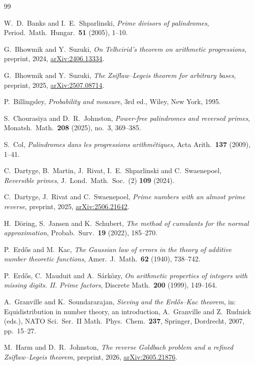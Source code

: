 \documentclass[11pt,a4paper]{article}
\theoremstyle{plain}
\theoremstyle{definition}
\numberwithin{equation}{section}
\begin{document}
\begin{thebibliography}{99}

 W.~D.~Banks and I.~E.~Shparlinski, \emph{Prime divisors of palindromes},
Period.\ Math.\ Hungar.\ \textbf{51} (2005), 1--10.

 G.~Bhowmik and Y.~Suzuki, \emph{On Telhcirid's theorem on arithmetic progressions},
preprint, 2024, \href{https://arxiv.org/abs/2406.13334}{arXiv:2406.13334}.

 G.~Bhowmik and Y.~Suzuki, \emph{The Zsiflaw--Legeis theorem for arbitrary bases},
preprint, 2025, \href{https://arxiv.org/abs/2507.08714}{arXiv:2507.08714}.

 P.~Billingsley, \emph{Probability and measure}, 3rd ed., Wiley, New York, 1995.

 S.~Chourasiya and D.~R.~Johnston, \emph{Power-free palindromes and reversed primes},
Monatsh.\ Math.\ \textbf{208} (2025), no.~3, 369--385.

 S.~Col, \emph{Palindromes dans les progressions arithm\'etiques},
Acta Arith.\ \textbf{137} (2009), 1--41.

 C.~Dartyge, B.~Martin, J.~Rivat, I.~E.~Shparlinski and C.~Swaenepoel,
\emph{Reversible primes},
J.\ Lond.\ Math.\ Soc.\ (2) \textbf{109} (2024).

 C.~Dartyge, J.~Rivat and C.~Swaenepoel, \emph{Prime numbers with an almost prime reverse},
preprint, 2025, \href{https://arxiv.org/abs/2506.21642}{arXiv:2506.21642}.

 H.~D\"oring, S.~Jansen and K.~Schubert, \emph{The method of cumulants for the normal
approximation}, Probab.\ Surv.\ \textbf{19} (2022), 185--270.

 P.~Erd\H os and M.~Kac, \emph{The Gaussian law of errors in the theory of additive number
theoretic functions}, Amer.\ J.\ Math.\ \textbf{62} (1940), 738--742.

 P.~Erd\H os, C.~Mauduit and A.~S\'ark\"ozy, \emph{On arithmetic properties of integers
with missing digits. II. Prime factors}, Discrete Math.\ \textbf{200} (1999), 149--164.

 A.~Granville and K.~Soundararajan, \emph{Sieving and the Erd\H os--Kac theorem}, in:
Equidistribution in number theory, an introduction, A.~Granville and Z.~Rudnick (eds.),
NATO Sci.\ Ser.\ II Math.\ Phys.\ Chem.\ \textbf{237}, Springer, Dordrecht, 2007, pp.\ 15--27.

 M.~Harm and D.~R.~Johnston, \emph{The reverse Goldbach problem and a refined
Zsiflaw--Legeis theorem}, preprint, 2026, \href{https://arxiv.org/abs/2605.21876}{arXiv:2605.21876}.


\end{thebibliography}
\end{document}
